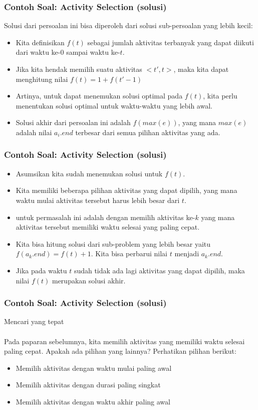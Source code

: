 \begin{frame}
	\frametitle{Contoh Soal: Activity Selection (solusi)}
	Solusi dari persoalan ini bisa diperoleh dari solusi sub-persoalan yang lebih kecil:
	
	\begin{itemize}
		\item Kita definisikan $f(t)$ sebagai jumlah aktivitas terbanyak yang dapat diikuti dari waktu ke-0 sampai waktu ke-$t$.
		\item Jika kita hendak memilih suatu aktivitas $<t' , t>$, maka kita dapat menghitung nilai $f(t) = 1 + f(t' - 1)$ 
		\item Artinya, untuk dapat menemukan solusi optimal pada $f(t)$, kita perlu menentukan solusi optimal untuk waktu-waktu yang lebih awal.
		\item Solusi akhir dari persoalan ini adalah $f(max(e))$, yang mana $max(e)$ adalah nilai $a_i.end$ terbesar dari semua pilihan aktivitas yang ada.
	\end{itemize}
\end{frame}

\begin{frame}
	\frametitle{Contoh Soal: Activity Selection (solusi)}
		
	\begin{itemize}
		\item Asumsikan kita sudah menemukan solusi untuk $f(t)$. 
		\item Kita memiliki beberapa pilihan aktivitas yang dapat dipilih, yang mana waktu mulai aktivitas tersebut harus lebih besar dari $t$.
		\item  {} untuk permasalah ini adalah dengan memilih aktivitas ke-$k$ yang mana aktivitas tersebut memiliki waktu selesai yang paling cepat. 
		\item Kita bisa hitung solusi dari sub-problem yang lebih besar yaitu $f(a_k.end) = f(t) + 1$. Kita bisa perbarui nilai $t$ menjadi $a_k.end$.
		\item Jika pada waktu $t$ sudah tidak ada lagi aktivitas yang dapat dipilih, maka nilai $f(t)$ merupakan solusi akhir.
	\end{itemize}
\end{frame}

\begin{frame}
	\frametitle{Contoh Soal: Activity Selection (solusi)}
	Mencari  yang tepat
	\\~
	\\
	Pada paparan sebelumnya, kita memilih aktivitas yang memiliki waktu selesai paling cepat. Apakah ada pilihan   yang lainnya? Perhatikan pilihan berikut:
	\begin{itemize}
		\item Memilih aktivitas dengan waktu mulai paling awal
		\item Memilih aktivitas dengan durasi paling singkat
		\item Memilih aktivitas dengan waktu akhir paling awal
	\end{itemize}
\end{frame}

